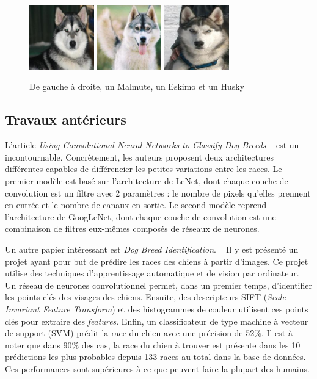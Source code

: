 \documentclass{article}
\begin{document}
\begin{figure}[htbp]
    \includegraphics[width=2.8cm]{../dataset/test/n02110063-malamute/n02110063_11838.jpg}\hfill 
    \includegraphics[width=2.8cm]{../dataset/test/n02109961-Eskimo_dog/n02109961_623.jpg}\hfill 
    \includegraphics[width=2.8cm]{../dataset/test/n02110185-Siberian_husky/n02110185_7564.jpg} 
    \caption{De gauche à droite, un Malmute, un Eskimo et un Husky}
    \label{1}
\end{figure} 

\subsection{Travaux antérieurs}
L'article \textit{Using Convolutional Neural Networks to Classify Dog Breeds}
~\cite{fcdh_FinalReport} est un incontournable. Concrètement, les auteurs
proposent  deux architectures différentes capables de différencier les petites
variations entre les races. Le premier modèle est basé sur l'architecture de 
LeNet, dont chaque couche de convolution est un filtre avec 2 paramètres : le 
nombre de pixels qu’elles prennent en entrée et le nombre de canaux en sortie.
Le second modèle reprend l'architecture de GoogLeNet, dont chaque couche de
convolution est une combinaison de filtres eux-mêmes composés de réseaux de
neurones.

Un autre papier intéressant est \textit{Dog Breed Identification}. 
~\cite{output} Il y est présenté un projet ayant pour but de prédire les races
des chiens à partir d’images. Ce projet utilise des techniques d’apprentissage
automatique et de vision par ordinateur. Un réseau de neurones convolutionnel
permet, dans un premier temps, d’identifier les points clés des visages des 
chiens. Ensuite, des descripteurs SIFT (\textit{Scale-Invariant Feature
Transform}) et des histogrammes de couleur utilisent ces points clés pour
extraire des \textit{features}. Enfin, un classificateur de type machine à
vecteur de support (SVM) prédit la race du chien avec une précision de 52\%. Il
est à noter que dans 90\% des cas, la race du chien à trouver est présente dans
les 10 prédictions les plus probables depuis 133 races au total dans la base de 
données. Ces performances sont supérieures à ce que peuvent faire la plupart
des humains.
\end{document}

